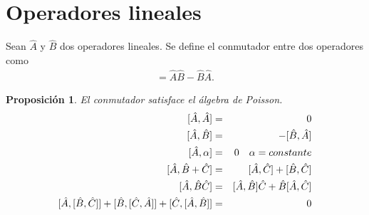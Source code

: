 \documentclass[letterpaper,12pt,oneside]{book}
\newtheorem{proposition}{Proposici\'on}[section]
\begin{document}
\section{Operadores lineales  }

Sean $\hat A$ y $\hat B$ dos operadores lineales.  Se define el conmutador entre dos operadores como 
%
\begin{eqnarray}
[{\hat {A}},{\hat {B}}]={\hat {A}}{\hat {B}}-{\hat {B}}{\hat {A}}.
\end{eqnarray}
%
\begin{proposition}
El conmutador satisface el \'algebra de Poisson.
%
\begin{eqnarray}
\protect [\hat A, \hat A] &=& 0 \label{conm1}\\
\protect [\hat A, \hat B] &=& - [\hat B,\hat A] \label{conm2}\\
\protect [\hat A, \alpha] &=& 0 \quad \alpha=constante\label{conm3}\\
\protect[\hat A, \hat B + \hat C] &=& [\hat A, \hat C] + [\hat B, \hat C]\label{conm4}\\
\protect[\hat A, \hat B\hat C] &=& [\hat A, \hat B]\hat C +  \hat B[\hat A,\hat C]\label{conm5}\\
\protect[\hat A, [\hat B,\hat C]] + [\hat B, [\hat C,\hat A]] + [\hat C, [\hat A,\hat B]] &=& 0\label{conm6}
\end{eqnarray}
%
\end{proposition}
%
\end{document}
